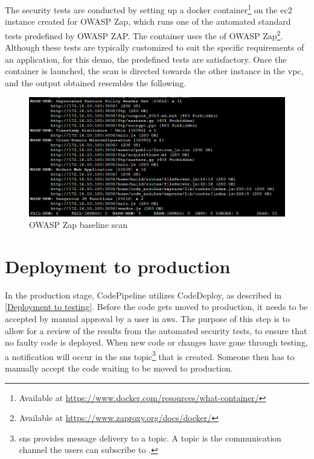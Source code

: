 The security tests are conducted by setting up a docker container\footnote{Available at \url{https://www.docker.com/resources/what-container/}} on the \acrshort{ec2} instance created for OWASP Zap, which runs one of the automated standard tests predefined by OWASP ZAP. The container uses the  of OWASP Zap\footnote{Available at \url{https://www.zaproxy.org/docs/docker/}}. Although these tests are typically customized to suit the specific requirements of an application, for this demo, the predefined tests are satisfactory. Once the container is launched, the scan is directed towards the other instance in the \acrshort{vpc}, and the output obtained resembles the following.

\vspace{2mm}
\begin{figure}[H]
    \centering
    \includegraphics[width=0.8\columnwidth]{Images/owasp-zap-scan.png}
    \caption{OWASP Zap baseline scan}
    \label{fig: OWASP Zap baseline scan}
\end{figure}


\section{Deployment to production}
In the production stage, CodePipeline utilizes CodeDeploy, as described in \ref{Deployment to testing}. Before the code gets moved to production, it needs to be accepted by manual approval by a user in \acrshort{aws}. The purpose of this step is to allow for a review of the results from the automated security tests, to
ensure that no faulty code is deployed. When new code or changes have gone through testing, a notification will occur in the \acrshort{sns} topic\footnote{\acrlong{sns} provides message delivery to a topic. A topic is the communication channel the users can subscribe to \cite{SNStopic}.} that is created. Someone then has to manually accept the code waiting to be moved to production.


